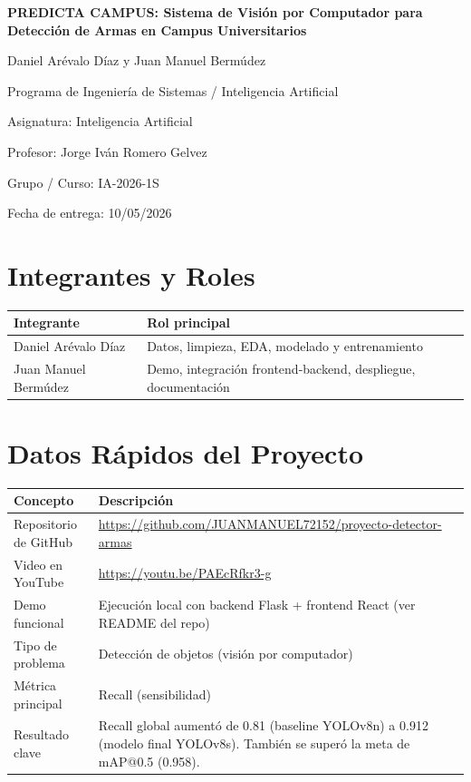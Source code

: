 \documentclass[12pt, letterpaper]{article}
\begin{document}
\begin{titlepage}
    \centering
    \vspace*{3cm}
    {\bfseries PREDICTA CAMPUS: Sistema de Visión por Computador para Detección de Armas en Campus Universitarios \par}
    \vspace{1cm}
    Daniel Arévalo Díaz y Juan Manuel Bermúdez \par
    \vspace{1cm}
    Programa de Ingeniería de Sistemas / Inteligencia Artificial \par
    Asignatura: Inteligencia Artificial \par
    Profesor: Jorge Iván Romero Gelvez \par
    Grupo / Curso: IA-2026-1S \par
    Fecha de entrega: 10/05/2026 \par
\end{titlepage}

\section{Integrantes y Roles}

\begin{center}
\begin{tabular}{L{6cm} L{8cm}}
\toprule
\textbf{Integrante} & \textbf{Rol principal} \\
\midrule
Daniel Arévalo Díaz & Datos, limpieza, EDA, modelado y entrenamiento \\
Juan Manuel Bermúdez & Demo, integración frontend-backend, despliegue, documentación \\
\bottomrule
\end{tabular}
\end{center}

\section{Datos Rápidos del Proyecto}

\begin{center}
\begin{tabular}{L{4cm} L{10cm}}
\toprule
\textbf{Concepto} & \textbf{Descripción} \\
\midrule
Repositorio de GitHub & \url{https://github.com/JUANMANUEL72152/proyecto-detector-armas} \\
Video en YouTube & \url{https://youtu.be/PAEcRfkr3-g} \\
Demo funcional & Ejecución local con backend Flask + frontend React (ver README del repo) \\
Tipo de problema & Detección de objetos (visión por computador) \\
Métrica principal & Recall (sensibilidad) \\
Resultado clave & Recall global aumentó de 0.81 (baseline YOLOv8n) a 0.912 (modelo final YOLOv8s). También se superó la meta de mAP@0.5 (0.958). \\
\bottomrule
\end{tabular}
\end{center}
\end{document}
